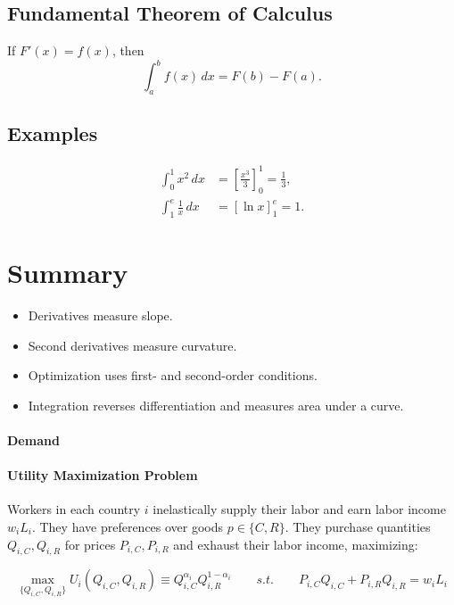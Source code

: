 \documentclass[11pt,letterpaper]{article}
\begin{document}
\subsection*{Fundamental Theorem of Calculus}
If $F'(x) = f(x)$, then
\[
\int_a^b f(x)\, dx = F(b) - F(a).
\]

\subsection*{Examples}
\begin{align*}
\int_0^1 x^2 \, dx &= \left[ \frac{x^3}{3} \right]_0^1 = \tfrac{1}{3}, \\
\int_1^e \frac{1}{x}\, dx &= [\ln x]_1^e = 1.
\end{align*}

\section*{Summary}
\begin{itemize}
    \item Derivatives measure slope.  
    \item Second derivatives measure curvature.  
    \item Optimization uses first- and second-order conditions.  
    \item Integration reverses differentiation and measures area under a curve.  
\end{itemize}



\paragraph{Demand} 

\paragraph{Utility Maximization Problem} Workers in each country $i$ inelastically supply their labor and earn labor income $w_i L_i$. They have preferences over goods $p \in \{ C, R\}$. They purchase quantities $Q_{i,C}, Q_{i,R}$ for prices $P_{i,C}, P_{i,R}$ and exhaust their labor income, maximizing:

\begin{equation*}
    \max_{\{Q_{i,C}, Q_{i,R}\}} U_i(Q_{i,C}, Q_{i,R}) \equiv Q_{i,C}^{\alpha_i} Q_{i,R}^{1-\alpha_i} \qquad s.t. \qquad P_{i,C} Q_{i,C} + P_{i,R} Q_{i,R} = w_i L_i
\end{equation*}
\end{document}
